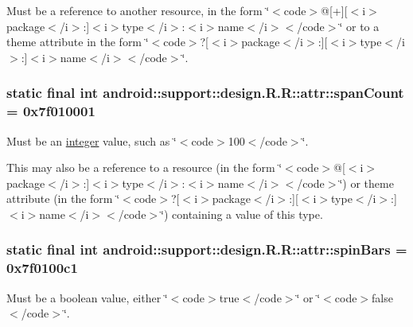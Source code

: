 Must be a reference to another resource, in the form \char`\"{}$<$code$>$@\mbox{[}+\mbox{]}\mbox{[}$<$i$>$package$<$/i$>$:\mbox{]}$<$i$>$type$<$/i$>$:$<$i$>$name$<$/i$>$$<$/code$>$\char`\"{} or to a theme attribute in the form \char`\"{}$<$code$>$?\mbox{[}$<$i$>$package$<$/i$>$:\mbox{]}\mbox{[}$<$i$>$type$<$/i$>$:\mbox{]}$<$i$>$name$<$/i$>$$<$/code$>$\char`\"{}. \hypertarget{classandroid_1_1support_1_1design_1_1_r_1_1attr_2c76a99385db222e14d7bc35fb072c3b}{
\subsubsection[{spanCount}]{\setlength{\rightskip}{0pt plus 5cm}static final int android::support::design.R.R::attr::spanCount = 0x7f010001}}
\label{classandroid_1_1support_1_1design_1_1_r_1_1attr_2c76a99385db222e14d7bc35fb072c3b}


Must be an \hyperlink{classandroid_1_1support_1_1design_1_1_r_1_1integer}{integer} value, such as \char`\"{}$<$code$>$100$<$/code$>$\char`\"{}. 

This may also be a reference to a resource (in the form \char`\"{}$<$code$>$@\mbox{[}$<$i$>$package$<$/i$>$:\mbox{]}$<$i$>$type$<$/i$>$:$<$i$>$name$<$/i$>$$<$/code$>$\char`\"{}) or theme attribute (in the form \char`\"{}$<$code$>$?\mbox{[}$<$i$>$package$<$/i$>$:\mbox{]}\mbox{[}$<$i$>$type$<$/i$>$:\mbox{]}$<$i$>$name$<$/i$>$$<$/code$>$\char`\"{}) containing a value of this type. \hypertarget{classandroid_1_1support_1_1design_1_1_r_1_1attr_7fa4a205739fa148ac3d3eca074dab07}{
\subsubsection[{spinBars}]{\setlength{\rightskip}{0pt plus 5cm}static final int android::support::design.R.R::attr::spinBars = 0x7f0100c1}}
\label{classandroid_1_1support_1_1design_1_1_r_1_1attr_7fa4a205739fa148ac3d3eca074dab07}


Must be a boolean value, either \char`\"{}$<$code$>$true$<$/code$>$\char`\"{} or \char`\"{}$<$code$>$false$<$/code$>$\char`\"{}. 

